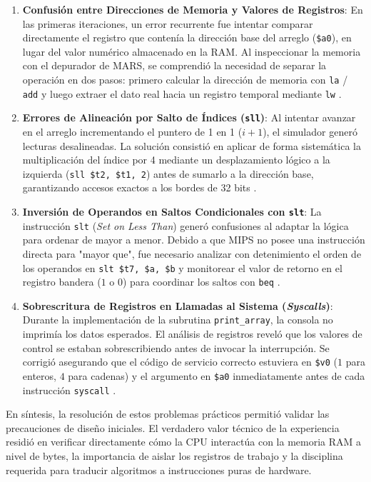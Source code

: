 \documentclass[12pt,a4paper]{article}
\begin{document}
\begin{enumerate}[leftmargin=*]
    \item \textbf{Confusión entre Direcciones de Memoria y Valores de Registros}: En las primeras iteraciones, un error recurrente fue intentar comparar directamente el registro que contenía la dirección base del arreglo (\texttt{\$a0}), en lugar del valor numérico almacenado en la RAM. Al inspeccionar la memoria con el depurador de MARS, se comprendió la necesidad de separar la operación en dos pasos: primero calcular la dirección de memoria con \texttt{la} / \texttt{add} y luego extraer el dato real hacia un registro temporal mediante \texttt{lw} \cite{mars}.

    \item \textbf{Errores de Alineación por Salto de Índices (\texttt{sll})}: Al intentar avanzar en el arreglo incrementando el puntero de 1 en 1 ($i + 1$), el simulador generó lecturas desalineadas. La solución consistió en aplicar de forma sistemática la multiplicación del índice por 4 mediante un desplazamiento lógico a la izquierda (\texttt{sll \$t2, \$t1, 2}) antes de sumarlo a la dirección base, garantizando accesos exactos a los bordes de 32 bits \cite{mars}.

    \item \textbf{Inversión de Operandos en Saltos Condicionales con \texttt{slt}}: La instrucción \texttt{slt} (\textit{Set on Less Than}) generó confusiones al adaptar la lógica para ordenar de mayor a menor. Debido a que MIPS no posee una instrucción directa para "mayor que", fue necesario analizar con detenimiento el orden de los operandos en \texttt{slt \$t7, \$a, \$b} y monitorear el valor de retorno en el registro bandera ($1$ o $0$) para coordinar los saltos con \texttt{beq} \cite{mars}.

    \item \textbf{Sobrescritura de Registros en Llamadas al Sistema (\textit{Syscalls})}: Durante la implementación de la subrutina \texttt{print\_array}, la consola no imprimía los datos esperados. El análisis de registros reveló que los valores de control se estaban sobrescribiendo antes de invocar la interrupción. Se corrigió asegurando que el código de servicio correcto estuviera en \texttt{\$v0} ($1$ para enteros, $4$ para cadenas) y el argumento en \texttt{\$a0} inmediatamente antes de cada instrucción \texttt{syscall} \cite{mars}.
\end{enumerate}

En síntesis, la resolución de estos problemas prácticos permitió validar las precauciones de diseño iniciales. El verdadero valor técnico de la experiencia residió en verificar directamente cómo la CPU interactúa con la memoria RAM a nivel de bytes, la importancia de aislar los registros de trabajo y la disciplina requerida para traducir algoritmos a instrucciones puras de hardware.
\end{document}
